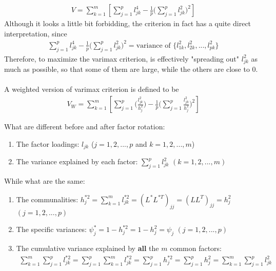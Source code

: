 \documentclass[12pt]{extarticle}
\newcommand{\<}{\langle}
\renewcommand{\>}{\rangle}
\theoremstyle{definition}
\begin{document}
\begin{tcolorbox}[enhanced, drop fuzzy shadow, title=Varimax Criterion (No need to memorize)]
\begin{align*}
    V=\sum^m_{k=1}\left[\sum^p_{j=1}l^4_{jk} -\frac{1}{p}\Bigg(\sum^p_{j=1}l^2_{jk}\Bigg)^2 \right]
\end{align*}
Although it looks a little bit forbidding, the criterion in fact has a quite direct interpretation, since
\begin{align*}
    \sum^p_{j=1}l^4_{jk} -\frac{1}{p}\Bigg(\sum^p_{j=1}l^2_{jk}\Bigg)^2 = \text{variance of } \{l^2_{1k},l^2_{2k},...,l^2_{pk}\}
\end{align*}
Therefore, to maximize the varimax criterion, is effectively "spreading out" $l^2_{jk}$ as much as possible, so that some of them are large, while the others are close to 0.\\
\ \\
A weighted version of varimax criterion is defined to be
\begin{align*}
    V_W=\sum^m_{k=1}\left[\sum^p_{j=1}\Bigg(\frac{l^2_{jk}}{h^2_j}\Bigg) -\frac{1}{p}\Bigg(\sum^p_{j=1}\frac{l^2_{jk}}{h^2_j}\Bigg)^2 \right]
\end{align*}
\end{tcolorbox}
\newpage
What are different before and after factor rotation:
\begin{enumerate}
    \item The factor loadings: $l_{jk}$ ($j=1,2,...,p$ and $k=1,2,...,m$)
    \item The variance explained by each factor: $\sum^p_{j=1} l^2_{jk}$ $(k=1,2,...,m)$
\end{enumerate}
While what are the same:
\begin{enumerate}
    \item The communalities: $h^{*2}_j =\sum^m_{k=1}l^{*2}_{jk}=(L^*L^{*T})_{jj}=(LL^T)_{jj}=h^2_j$ $(j=1,2,...,p)$
    \item The specific variances: $\psi^*_j =1-h^{*2}_j =1-h^2_j =\psi_j$ $(j=1,2,...,p)$
    \item The cumulative variance explained by \textbf{all} the $m$ common factors:
    \begin{align*}
        \sum^m_{k=1}\sum^p_{j=1}l^{*2}_{jk}
        =\sum^p_{j=1}\sum^m_{k=1}l^{*2}_{jk}
        =\sum^p_{j=1}h^{*2}_j
        =\sum^p_{j=1}h^2_j
        =\sum^m_{k=1}\sum^p_{j=1}l^{2}_{jk}
    \end{align*}
\end{enumerate}
\end{document}

